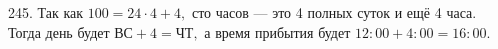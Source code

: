 245. Так как $100=24\cdot4+4,$ сто часов --- это 4 полных суток и ещё 4 часа. Тогда день будет $\text{ВС}+4=\text{ЧТ},$ а время прибытия будет $12:00+4:00=16:00.$\\
